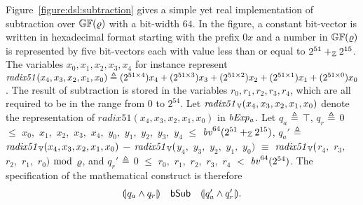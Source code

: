Figure~\ref{figure:dsl:subtraction} gives a simple yet real implementation of subtraction over $\bbfGF(\myprime)$ with a bit-width $64$.
In the figure, a constant bit-vector is written in hexadecimal format starting with the prefix $0x$ and a number in $\bbfGF(\varrho)$ is represented by five bit-vectors each with value less than or equal to $2^{51} +_\bbfZ 2^{15}$.
The variables ${x}_0, {x}_1, {x}_2, {x}_3, {x}_4$ for instance represent $\mathit{radix51}({x}_4, {x}_3, {x}_2, {x}_1, {x}_0) \defn (2^{51 \times 4}) {x}_4 + (2^{51 \times 3}) {x}_3 + (2^{51 \times 2}) {x}_2 + (2^{51 \times 1}) {x}_1 + (2^{51 \times 0}) {x}_0$.
The result of subtraction is stored in the variables ${r}_0, {r}_1, {r}_2, {r}_3, {r}_4$, which are all required to be in the range from $0$ to $2^{54}$.
Let $\mathit{radix51}_\BV({x}_4, {x}_3, {x}_2, {x}_1, {x}_0)$ denote the representation of $\mathit{radix51}({x}_4, {x}_3, {x}_2, {x}_1, {x}_0)$ in $\bvExpa$.
Let $q_a$ $\defn$ $\top$, $q_r$ $\defn$ $0$ $\leq$ ${x}_0,$ ${x}_1,$ ${x}_2,$ ${x}_3,$ ${x}_4,$ ${y}_0,$ ${y}_1,$ ${y}_2,$ ${y}_3,$ ${y}_4$ $\leq$ $\bv^{64}(2^{51} +_\bbfZ 2^{15})$, $q_a'$ $\defn$ $\mathit{radix51}_\BV({x}_4, {x}_3, {x}_2, {x}_1, {x}_0)$ $-$ $\mathit{radix51}_\BV($${y}_4,$ ${y}_3,$ ${y}_2,$ ${y}_1,$ ${y}_0)$ $\equiv$ $\mathit{radix51}_\BV($${r}_4,$ ${r}_3,$ ${r}_2,$ ${r}_1,$ ${r}_0)$ $\mod$ $\myprime$, and $q_r'$ $\defn$ $0$ $\leq$ ${r}_0,$ ${r}_1,$ ${r}_2,$ ${r}_3,$ ${r}_4$ $<$ $\bv^{64}(2^{54})$.
The specification of the mathematical construct is therefore
\[
\begin{array}{rcl}
\cond{q_a \wedge q_r} &
\dslcode{bSub} &
\cond{q_a' \wedge q_r'}.
\end{array}
\]


